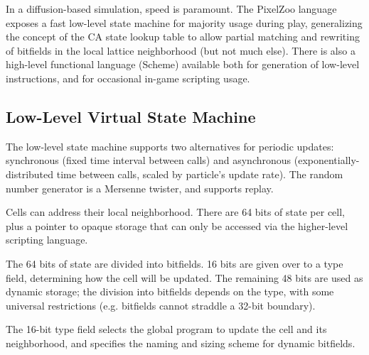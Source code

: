 \documentclass{acm_proc_article-sp}
\begin{document}
In a diffusion-based simulation, speed is paramount.
The PixelZoo language exposes a fast low-level state machine for majority usage during play,
generalizing the concept of the CA state lookup table to allow partial matching
and rewriting of bitfields in the local lattice neighborhood (but not much else).
There is also a high-level functional language (Scheme) available both for generation of low-level instructions,
and for occasional in-game scripting usage.

\subsection{Low-Level Virtual State Machine}

The low-level state machine supports two alternatives for periodic updates:
synchronous (fixed time interval between calls)
and asynchronous (exponentially-distributed time between calls, scaled by particle's update rate).
The random number generator is a Mersenne twister, and supports replay.

Cells can address their local neighborhood.
There are 64 bits of state per cell,
plus a pointer to opaque storage that can only be accessed via the higher-level scripting language.

The 64 bits of state are divided into bitfields.
16 bits are given over to a type field, determining how the cell will be updated.
The remaining 48 bits are used as dynamic storage; the division into bitfields depends on the type,
with some universal restrictions (e.g. bitfields cannot straddle a 32-bit boundary).

The 16-bit type field selects the global program to update the cell and its neighborhood,
and specifies the naming and sizing scheme for dynamic bitfields.
\end{document}
